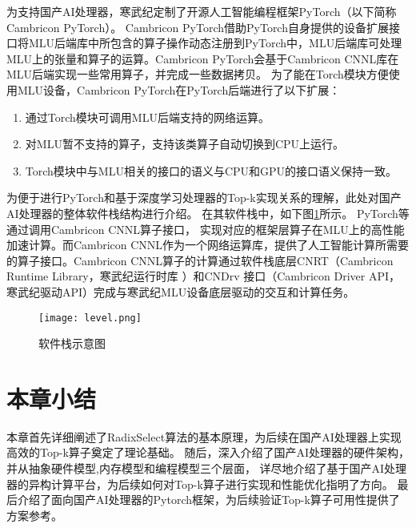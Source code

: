 为支持国产AI处理器，寒武纪定制了开源人工智能编程框架PyTorch（以下简称Cambricon PyTorch）。
Cambricon PyTorch借助PyTorch自身提供的设备扩展接口将MLU后端库中所包含的算子操作动态注册到PyTorch中，MLU后端库可处理MLU上的张量和算子的运算。Cambricon PyTorch会基于Cambricon CNNL库在MLU后端实现一些常用算子，并完成一些数据拷贝。
为了能在Torch模块方便使用MLU设备，Cambricon PyTorch在PyTorch后端进行了以下扩展：
\begin{enumerate} 
\item 通过Torch模块可调用MLU后端支持的网络运算。

\item 对MLU暂不支持的算子，支持该类算子自动切换到CPU上运行。

\item Torch模块中与MLU相关的接口的语义与CPU和GPU的接口语义保持一致。
\end{enumerate}
为便于进行PyTorch和基于深度学习处理器的Top-k实现关系的理解，此处对国产AI处理器的整体软件栈结构进行介绍。
在其软件栈中，如下图\ref{fig:level}所示。
PyTorch等通过调用Cambricon CNNL算子接口，
实现对应的框架层算子在MLU上的高性能加速计算。而Cambricon CNNL作为一个网络运算库，提供了人工智能计算所需要
的算子接口。Cambricon CNNL算子的计算通过软件栈底层CNRT（Cambricon Runtime Library，寒武纪运行时库
）和CNDrv 接口（Cambricon Driver API，寒武纪驱动API）完成与寒武纪MLU设备底层驱动的交互和计算任务。


\begin{figure}[ht]
    \centering
    \texttt{[image: level.png]}
    \caption{软件栈示意图}
    \label{fig:level}
    \note{}
  \end{figure}



\section{本章小结}
本章首先详细阐述了RadixSelect算法的基本原理，为后续在国产AI处理器上实现高效的Top-k算子奠定了理论基础。
随后，深入介绍了国产AI处理器的硬件架构，并从抽象硬件模型,内存模型和编程模型三个层面，
详尽地介绍了基于国产AI处理器的异构计算平台，为后续如何对Top-k算子进行实现和性能优化指明了方向。
最后介绍了面向国产AI处理器的Pytorch框架，为后续验证Top-k算子可用性提供了方案参考。